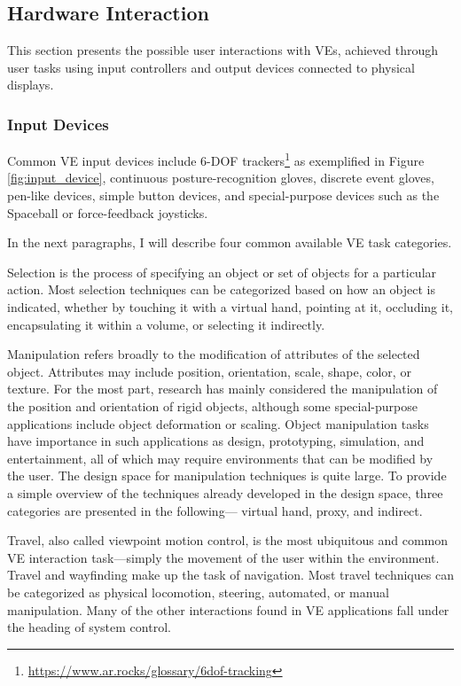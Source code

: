 \subsection{Hardware Interaction}
\label{sec:hardware_interaction}

This section presents the possible user interactions with \glspl{VE}, achieved through user tasks using input controllers and output devices connected to physical displays.

\subsubsection{Input Devices}
\label{sec:input_devices}

Common \gls{VE} input devices include \gls{6-DOF} trackers\footnote{\url{https://www.ar.rocks/glossary/6dof-tracking}} as exemplified in Figure \ref{fig:input_device}, continuous posture-recognition gloves, discrete 
event gloves, pen-like devices, simple button devices, and special-purpose devices such as the 
Spaceball or force-feedback joysticks. 

In the next paragraphs, I will describe four common available VE task categories.

Selection is the process of specifying an object or set of objects for a particular action. 
Most selection techniques can be categorized based on how an object is indicated, whether
by touching it with a virtual hand, pointing at it, occluding it, encapsulating it within a volume, or 
selecting it indirectly.

Manipulation refers broadly to the  modification of 
attributes of the selected object. Attributes may include position, orientation, scale, shape, color, 
or texture. For the most part, research has mainly considered the manipulation of the  position 
and orientation of rigid objects, although some special-purpose applications include object deformation or scaling. Object manipulation tasks have importance in such applications as design, 
prototyping, simulation, and entertainment, all of which may require environments that can be 
modified by the user. The design space for manipulation techniques is quite large. To provide a simple overview of the 
techniques already developed in the design space, three categories are presented in the following—
virtual hand, proxy, and indirect. 

Travel, also called viewpoint motion control, is the most ubiquitous and common \gls{VE} interaction 
task—simply the movement of the user within the environment. Travel and wayfinding make up the task of navigation. 
Most travel techniques can be categorized as physical locomotion, steering, automated, or manual manipulation. 
Many of the other interactions found in VE applications fall under the heading of system control. 

